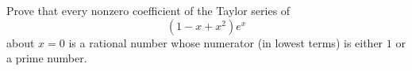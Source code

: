 Prove that every nonzero coefficient of the Taylor series of
\[
(1 - x + x^2)e^x
\]
about $x=0$ is a rational number whose numerator (in lowest terms) is either $1$ or a prime number.

